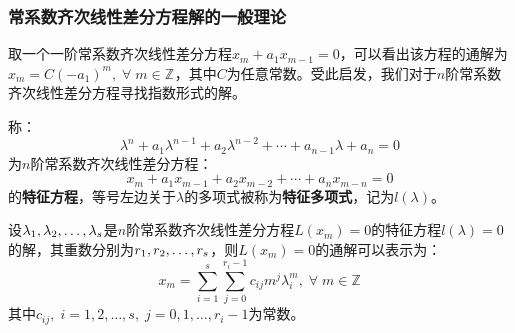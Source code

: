 \subsubsection{常系数齐次线性差分方程解的一般理论}
\begin{derivation}
	取一个一阶常系数齐次线性差分方程$x_m+a_1x_{m-1}=0$，可以看出该方程的通解为$x_m=C(-a_1)^m,\;\forall\;m\in\mathbb{Z}^{}$，其中$C$为任意常数。受此启发，我们对于$n$阶常系数齐次线性差分方程寻找指数形式的解。
\end{derivation}
\begin{definition}
	称：
	\begin{equation*}
		\lambda^n+a_1\lambda^{n-1}+a_2\lambda^{n-2}+\cdots+a_{n-1}\lambda+a_n=0
	\end{equation*}
	为$n$阶常系数齐次线性差分方程：
	\begin{equation*}
		x_m+a_1x_{m-1}+a_2x_{m-2}+\cdots+a_nx_{m-n}=0
	\end{equation*}
	的\textbf{特征方程}，等号左边关于$\lambda$的多项式被称为\textbf{特征多项式}，记为$l(\lambda)$。
\end{definition}
\begin{theorem}\label{theo:GeneralSolutionHomogeneousLinearDifferenceEqConstantCoefficients}
	设$\lambda_1, \lambda_2, \dots, \lambda_{s}$是$n$阶常系数齐次线性差分方程$L(x_m)=0$的特征方程$l(\lambda)=0$的解，其重数分别为$r_1, r_2, \dots, r_{s}$，则$L(x_m)=0$的通解可以表示为：
	\begin{equation*}
		x_m=\sum_{i=1}^{s}\sum_{j=0}^{r_i-1}c_{ij}m^{j}\lambda_i^m,\;\forall\;m\in\mathbb{Z}^{}
	\end{equation*}
	其中$c_{ij},\;i=1,2,\dots,s,\;j=0,1,\dots,r_i-1$为常数。
\end{theorem}
